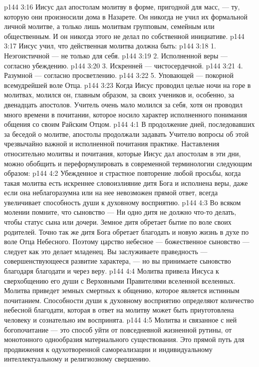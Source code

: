 \vs p144 3:16 Иисус дал апостолам молитву в форме, пригодной для масс, --- ту, которую они произносили дома в Назарете. Он никогда не учил их формальной личной молитве, а только лишь молитвам групповым, семейным или общественным. И он никогда этого не делал по собственной инициативе.
\vs p144 3:17 Иисус учил, что действенная молитва должна быть:
\vs p144 3:18 1. Неэгоистичной --- не только для себя.
\vs p144 3:19 2. Исполненной веры --- согласно убеждению.
\vs p144 3:20 3. Искренней --- чистосердечной.
\vs p144 3:21 4. Разумной --- согласно просветлению.
\vs p144 3:22 5. Уповающей --- покорной всемудрейшей воле Отца.
\vs p144 3:23 Когда Иисус проводил целые ночи на горе в молитвах, молился он, главным образом, за своих учеников и, особенно, за двенадцать апостолов. Учитель очень мало молился за себя, хотя он проводил много времени в почитании, которое носило характер исполненного понимания общения со своим Райским Отцом.
\vs p144 4:1 В продолжение дней, последовавших за беседой о молитве, апостолы продолжали задавать Учителю вопросы об этой чрезвычайно важной и исполненной почитания практике. Наставления относительно молитвы и почитания, которые Иисус дал апостолам в эти дни, можно обобщить и переформулировать в современной терминологии следующим образом:
\vs p144 4:2 Убежденное и страстное повторение любой просьбы, когда такая молитва есть искреннее словоизлияние дитя Бога и исполнена веры, даже если она неблагоразумна или на нее невозможен прямой ответ, всегда увеличивает способность души к духовному восприятию.
\vs p144 4:3 Во всяком молении помните, что сыновство ---  Ни одно дитя не должно что\hyp{}то делать, чтобы  статус сына или дочери. Земное дитя обретает бытие по воле своих родителей. Точно так же дитя Бога обретает благодать и новую жизнь в духе по воле Отца Небесного. Поэтому царство небесное --- божественное сыновство --- следует  как это делает младенец. Вы заслуживаете праведность --- совершенствующееся развитие характера, --- но вы принимаете сыновство благодаря благодати и через веру.
\vs p144 4:4 Молитва привела Иисуса к сверхобщению его души с Верховными Правителями вселенной вселенных. Молитва приведет земных смертных к общению, которое является истинным почитанием. Способности души к духовному восприятию определяют количество небесной благодати, которая в ответ на молитву может быть приуготовлена человеку и сознательно им воспринята.
\vs p144 4:5 Молитва и связанное с ней богопочитание --- это способ уйти от повседневной жизненной рутины, от монотонного однообразия материального существования. Это прямой путь для продвижения к одухотворенной самореализации и индивидуальному интеллектуальному и религиозному свершению.
